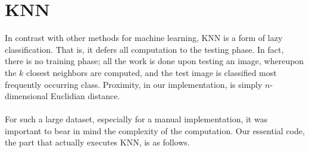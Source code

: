\documentclass[10pt]{extarticle}
\begin{document}
\section{KNN}
In contrast with other methods for machine learning, KNN is a form of lazy classification. That is, it defers all computation to the testing phase. In fact, there is no training phase; all the work is done upon testing an image, whereupon the $k$ closest neighbors are computed, and the test image is classified most frequently occurring class. Proximity, in our implementation, is simply $n$-dimensional Euclidian distance.\\\\
For such a large dataset, especially for a manual implementation, it was important to bear in mind the complexity of the computation. Our essential code, the part that actually executes KNN, is as follows. 
\end{document}
